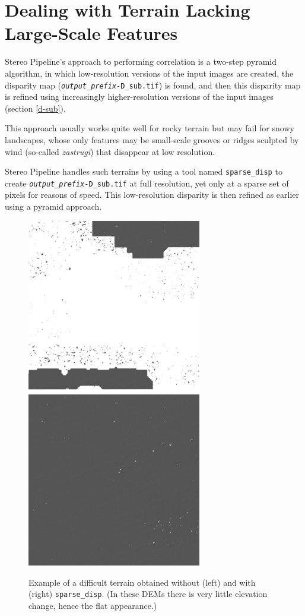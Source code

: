 \section{Dealing with Terrain Lacking Large-Scale Features}
\label{sparse-disp}

Stereo Pipeline's approach to performing correlation is a two-step
pyramid algorithm, in which low-resolution versions of the input images
are created, the disparity map
(\texttt{\textit{output\_prefix}-D\_sub.tif}) is found, and then this
disparity map is refined using increasingly higher-resolution versions
of the input images (section \ref{d-sub}).

This approach usually works quite well for rocky terrain but may fail
for snowy landscapes, whose only features may be small-scale
grooves or ridges sculpted by wind (so-called {\it zastrugi}) that
disappear at low resolution.

Stereo Pipeline handles such terrains by using a tool named
\texttt{sparse\_disp} to create
\texttt{\textit{output\_prefix}-D\_sub.tif} at full resolution, yet only
at a sparse set of pixels for reasons of speed. This
low-resolution disparity is then refined as earlier using a pyramid
approach.

\begin{figure}[h!]
\centering
  \includegraphics[width=3.0in]{images/examples/sparse_disp1.png}
  \includegraphics[width=3.0in]{images/examples/sparse_disp3.png}
\caption{Example of a difficult terrain obtained without (left) and with (right) \texttt{sparse\_disp}. (In these DEMs there is very little elevation change, hence the flat appearance.)}
\label{fig:sparse-disp-example}
\end{figure}


